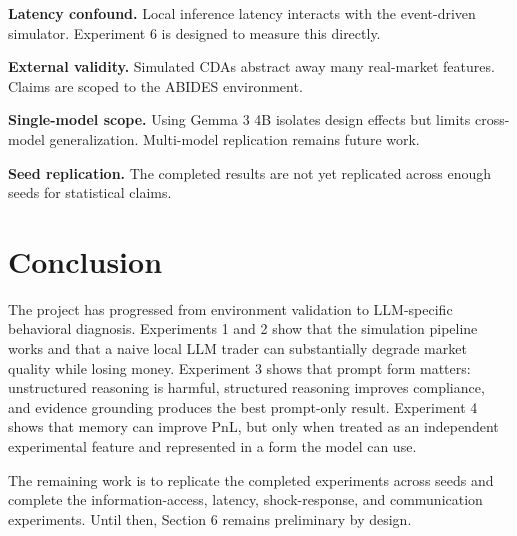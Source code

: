 \documentclass[11pt]{article}
\begin{document}
\textbf{Latency confound.} Local inference latency interacts with the event-driven simulator. Experiment 6 is designed to measure this directly.

\textbf{External validity.} Simulated CDAs abstract away many real-market features. Claims are scoped to the ABIDES environment.

\textbf{Single-model scope.} Using Gemma 3 4B isolates design effects but limits cross-model generalization. Multi-model replication remains future work.

\textbf{Seed replication.} The completed results are not yet replicated across enough seeds for statistical claims.

\section{Conclusion}

The project has progressed from environment validation to LLM-specific behavioral diagnosis. Experiments 1 and 2 show that the simulation pipeline works and that a naive local LLM trader can substantially degrade market quality while losing money. Experiment 3 shows that prompt form matters: unstructured reasoning is harmful, structured reasoning improves compliance, and evidence grounding produces the best prompt-only result. Experiment 4 shows that memory can improve PnL, but only when treated as an independent experimental feature and represented in a form the model can use.

The remaining work is to replicate the completed experiments across seeds and complete the information-access, latency, shock-response, and communication experiments. Until then, Section 6 remains preliminary by design.
\end{document}
